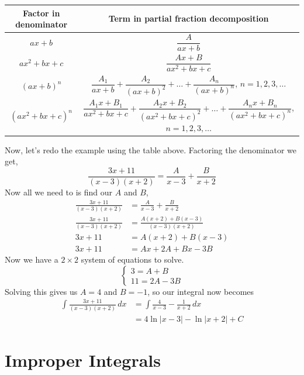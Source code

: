 \documentclass[10pt,reqno]{book}
\theoremstyle{definition}
\begin{document}
	\begin{center}
		\begin{tabular}{c|c}
			Factor in denominator & Term in partial fraction decomposition\\ \hline
			$ ax+b $ & $ \dfrac{A}{ax+b} $ \\ [2ex] 
			$ ax^2 + bx + c $ & $ \dfrac{Ax + B}{ax^2 + bx + c} $\\ [2ex] 
			$ (ax+b)^n $ & $ \dfrac{A_1}{ax+b} + \dfrac{A_2}{(ax+b)^2} + \ldots + \dfrac{A_n}{(ax+b)^n} $, $ n = 1,2,3,\ldots $\\ [2ex]
			$ (ax^2 + bx + c)^n $ & $ \dfrac{A_1x + B_1}{ax^2+bx+c} + \dfrac{A_2x + B_2}{(ax^2+bx+c)^2} + \ldots + \dfrac{A_nx + B_n}{(ax^2+bx+c)^n} $, $ n=1,2,3,\ldots $
		\end{tabular}
	\end{center}
	Now, let's redo the example using the table above. Factoring the denominator we get,
	\[ \frac{3x + 11}{(x-3)(x+2)} = \frac{A}{x-3} + \frac{B}{x+2} \]
	Now all we need to is find our $ A $ and $ B $,
	\begin{align*}
		\frac{3x + 11}{(x-3)(x+2)} &= \frac{A}{x-3} + \frac{B}{x+2}\\
		\frac{3x + 11}{(x-3)(x+2)} &= \frac{A(x+2) + B(x-3)}{(x-3)(x+2)}\\
		3x + 11 &= A(x+2) + B(x-3)\\
		3x + 11 &= Ax + 2A + Bx - 3B
	\end{align*}
	Now we have a $ 2\times 2 $ system of equations to solve.
	\begin{equation*}
		\begin{cases}
			3 = A + B\\
			11 = 2A - 3B
		\end{cases}
	\end{equation*}
	Solving this gives us $ A = 4 $ and $ B = -1 $, so our integral now becomes
	\begin{align*}
		\int \frac{3x + 11}{(x-3)(x+2)}\,dx &= \int \frac{4}{x-3} - \frac{1}{x+2}\,dx\\
		&= 4\ln|x-3| - \ln|x+2| +C                                          	
	\end{align*}

	\section{Improper Integrals}
	
\end{document}
